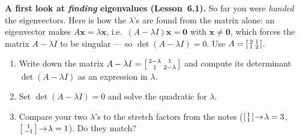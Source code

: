 \documentclass[10pt]{article}
\newcommand{\xx}{\mathbf{x}}
\newcommand{\zero}{\mathbf{0}}
\begin{document}
\begin{tcolorbox}[colback=white, colframe=black!40, title=\textbf{Tier E --- Extension},
    fonttitle=\bfseries, arc=1.5mm, left=3mm, right=3mm, top=2mm, bottom=2mm, breakable]
\textbf{A first look at \emph{finding} eigenvalues (Lesson~6.1).} So far you were \emph{handed} the
eigenvectors. Here is how the $\lambda$'s are found from the matrix alone: an eigenvector makes
$A\xx=\lambda\xx$, i.e.\ $(A-\lambda I)\xx=\zero$ with $\xx\ne\zero$, which forces the matrix
$A-\lambda I$ to be singular --- so $\det(A-\lambda I)=0$. Use $A=\begin{bsmallmatrix} 2 & 1\\ 1 & 2 \end{bsmallmatrix}$.
\begin{enumerate}[leftmargin=1.7em, itemsep=9pt]
  \item Write down the matrix $A-\lambda I=\begin{bsmallmatrix} 2-\lambda & 1\\ 1 & 2-\lambda \end{bsmallmatrix}$
        and compute its determinant $\det(A-\lambda I)$ as an expression in $\lambda$. 
  \item Set $\det(A-\lambda I)=0$ and solve the quadratic for $\lambda$. 
  \item Compare your two $\lambda$'s to the stretch factors from the notes
        ($\begin{bsmallmatrix} 1\\ 1 \end{bsmallmatrix}\!\to\!\lambda=3$,
        $\begin{bsmallmatrix} 1\\ -1 \end{bsmallmatrix}\!\to\!\lambda=1$). Do they match? \writeline
\end{enumerate}
\end{tcolorbox}
\end{document}
